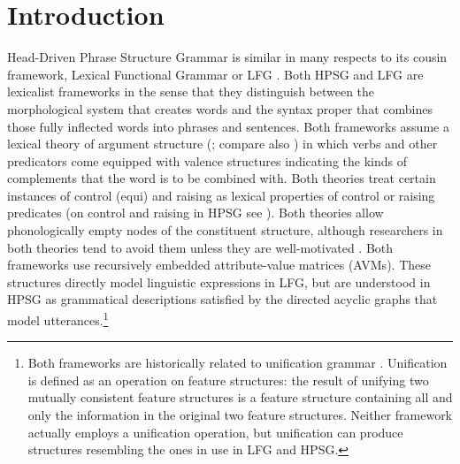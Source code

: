 



\newcommand{\ednote}[1]{}


\maketitle
\label{chap-lfg}




\section{Introduction} 
\label{intro-sec}
Head-Driven Phrase Structure Grammar is similar in many respects to its cousin framework, Lexical Functional Grammar or LFG \citep{BATW2016a,dalrymple;ea19}.  Both HPSG and LFG are lexicalist frameworks in the sense that they distinguish between the morphological system that creates words and the syntax proper that combines those fully inflected words into phrases and sentences.  Both frameworks assume a lexical theory of argument structure (\citealp{MWArgSt}; compare also ) in which verbs and other predicators come equipped with valence structures indicating the kinds of complements that the word is to be combined with.  Both theories treat certain instances of control (equi) and raising as lexical properties of control or raising predicates (on control and raising in HPSG see ). Both theories allow phonologically empty nodes of the constituent structure, although researchers in both theories tend to avoid them unless they are well-motivated \citep[734--742]{SF94a,Berman97a,dalrymple;ea19}. Both frameworks use recursively embedded attribute-value matrices (AVMs). These structures directly model linguistic expressions in LFG, but are understood in HPSG as grammatical descriptions satisfied by the directed acyclic graphs that model utterances.\footnote{Both frameworks are historically related to unification grammar \citep{Kay84a-u}.  Unification is defined as an operation on feature structures:  the result of unifying two mutually consistent feature structures is a feature structure containing all and only the information in the original two feature structures.  Neither framework actually employs a unification operation, but unification can produce structures resembling the ones in use in LFG and HPSG.} 
